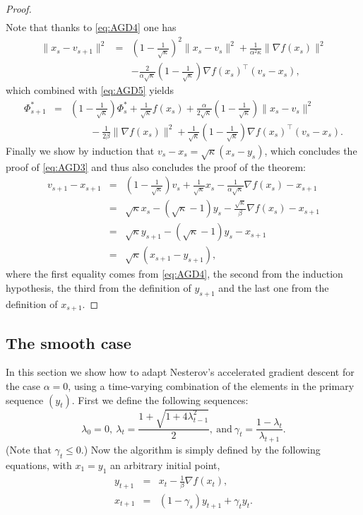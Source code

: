 \documentclass[openany]{now}
\begin{document}
\begin{proof}
\begin{align}
\end{align}
Note that thanks to \eqref{eq:AGD4} one has
\begin{eqnarray*}
\|x_s - v_{s+1}\|^2 & = & \left(1 - \frac{1}{\sqrt{\kappa}}\right)^2 \|x_s - v_s\|^2 + \frac{1}{\alpha^2 \kappa} \|\nabla f(x_s)\|^2 \\
& & - \frac{2}{\alpha \sqrt{\kappa}} \left(1 - \frac{1}{\sqrt{\kappa}}\right) \nabla f(x_s)^{\top}(v_s-x_s) ,
\end{eqnarray*}
which combined with \eqref{eq:AGD5} yields
\begin{eqnarray*}
\Phi_{s+1}^* & = & \left(1 - \frac{1}{\sqrt{\kappa}}\right) \Phi_s^* + \frac{1}{\sqrt{\kappa}} f(x_s) + \frac{\alpha}{2 \sqrt{\kappa}} \left(1 - \frac{1}{\sqrt{\kappa}}\right) \|x_s - v_s\|^2 \\
& & \qquad - \frac{1}{2 \beta} \| \nabla f(x_s) \|^2 + \frac{1}{\sqrt{\kappa}} \left(1 - \frac{1}{\sqrt{\kappa}}\right) \nabla f(x_s)^{\top}(v_s-x_s) .
\end{eqnarray*}
Finally we show by induction that $v_s - x_s = \sqrt{\kappa}(x_s - y_s)$, which concludes the proof of \eqref{eq:AGD3} and thus also concludes the proof of the theorem:
\begin{eqnarray*}
v_{s+1} - x_{s+1} & = & \left(1 - \frac{1}{\sqrt{\kappa}}\right) v_s + \frac{1}{\sqrt{\kappa}} x_s - \frac{1}{\alpha \sqrt{\kappa}} \nabla f(x_s) - x_{s+1} \\
& = & \sqrt{\kappa} x_s - (\sqrt{\kappa}-1) y_s - \frac{\sqrt{\kappa}}{\beta} \nabla f(x_s) - x_{s+1} \\
& = & \sqrt{\kappa} y_{s+1} - (\sqrt{\kappa}-1) y_s - x_{s+1} \\
& = & \sqrt{\kappa} (x_{s+1} - y_{s+1}) ,
\end{eqnarray*}
where the first equality comes from \eqref{eq:AGD4}, the second from the induction hypothesis, the third from the definition of $y_{s+1}$ and the last one from the definition of $x_{s+1}$.
\end{proof}

\subsection{The smooth case}
In this section we show how to adapt Nesterov's accelerated gradient descent for the case $\alpha=0$, using a time-varying combination of the elements in the primary sequence $(y_t)$. First we define the following sequences:
$$\lambda_0 = 0, \ \lambda_{t} = \frac{1 + \sqrt{1+ 4 \lambda_{t-1}^2}}{2}, \ \text{and} \  \gamma_t = \frac{1 - \lambda_t}{\lambda_{t+1}}.$$
(Note that $\gamma_t \leq 0$.) Now the algorithm is simply defined by the following equations, with $x_1 = y_1$ an arbitrary initial point,
\begin{eqnarray*}
y_{t+1} & = & x_t  - \frac{1}{\beta} \nabla f(x_t) , \\
x_{t+1} & = & (1 - \gamma_s) y_{t+1} + \gamma_t y_t .
\end{eqnarray*}
\end{document}

